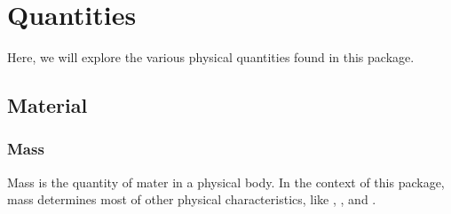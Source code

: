 \documentclass[letterpaper,10pt,english]{sphinxmanual}
\begin{document}
\chapter{Quantities}
\label{\detokenize{quantities/quantities:quantities}}\label{\detokenize{quantities/quantities::doc}}\label{\detokenize{quantities/quantities:id1}}
\sphinxAtStartPar
Here, we will explore the various physical quantities found in this package.


\section{Material}
\label{\detokenize{quantities/material/material:material}}\label{\detokenize{quantities/material/material::doc}}

\subsection{Mass}
\label{\detokenize{quantities/material/mass:mass}}\label{\detokenize{quantities/material/mass::doc}}\label{\detokenize{quantities/material/mass:id1}}
\sphinxAtStartPar
Mass is the quantity of mater in a physical body.
In the context of this package, mass determines most of other physical characteristics,
like {\hyperref[\detokenize{quantities/geometric/radius:id1}]{}}, {\hyperref[\detokenize{quantities/surface/emission/luminosity:id1}]{}}, {\hyperref[\detokenize{quantities/rotational/spin_period:id1}]{}} and
{\hyperref[\detokenize{quantities/life/lifetime:id1}]{}}.
\end{document}
